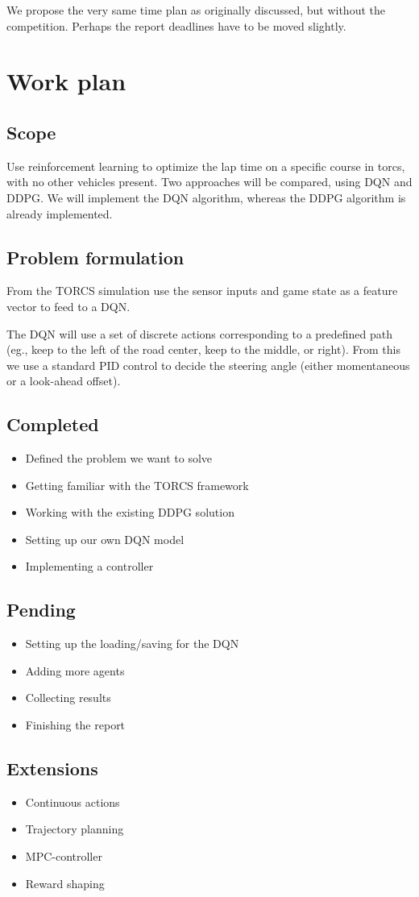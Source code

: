 \documentclass{article}
\begin{document}
We propose the very same time plan as originally discussed, but without the competition. Perhaps the report deadlines have to be moved slightly.

\section{Work plan}
\subsection{Scope}
Use reinforcement learning to optimize the lap time on a specific course in torcs, with no other vehicles present. Two approaches will be compared, using DQN and DDPG. We will implement the DQN algorithm, whereas the DDPG algorithm is already implemented.

\subsection{Problem formulation}
From the TORCS simulation use the sensor inputs and game state as a feature vector to feed to a DQN. 

The DQN will use a set of discrete actions corresponding to a predefined path (eg., keep to the left of the road center, keep to the middle, or right). From this we use a standard PID control to decide  the steering angle (either momentaneous or a look-ahead offset).

\subsection{Completed}

\begin{itemize}
	\item Defined the problem we want to solve
	\item Getting familiar with the TORCS framework
	\item Working with the existing DDPG solution
	\item Setting up our own DQN model
	\item Implementing a controller
\end{itemize}

\subsection{Pending}

\begin{itemize}
	\item Setting up the loading/saving for the DQN
	\item Adding more agents
	\item Collecting results
	\item Finishing the report
\end{itemize}

\subsection{Extensions}

\begin{itemize}
	\item Continuous actions
	\item Trajectory planning
	\item MPC-controller
	\item Reward shaping
	
\end{itemize}
\end{document}
